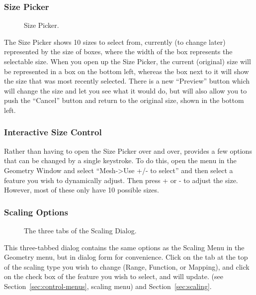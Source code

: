 \subsubsection{Size Picker}

\begin{figure}[htb]
  \begin{makeimage}
  \end{makeimage}
  \sizepicker
  \caption{\label{fig:sizepicker1} Size Picker.}
\end{figure}


The Size Picker shows 10 sizes to select from, currently (to change later)
represented by the size of boxes, where the width of the box represents the
selectable size.  When you open up the Size Picker, the current (original)
size will be represented in a box on the bottom left, whereas the box next
to it will show the size that was most recently selected.  There is a new
``Preview'' button which will change the size and let you see what it would
do, but will also allow you to push the ``Cancel'' button and return to the
original size, shown in the bottom left.

\subsubsection{Interactive Size Control}
\label{sec:interactive-size}

Rather than having to open the Size Picker over and over, \map{} provides a
few options that can be changed by a single keystroke.  To do this, open
the menu in the Geometry Window and select ``Mesh->Use +/- to select'' and
then select a feature you wish to dynamically adjust.  Then press + or - to
adjust the size.  However, most of these only have 10 possible sizes.



\subsubsection{Scaling Options}
\label{sec:scalinggui}

\begin{figure}[htb]
  \begin{makeimage}
  \end{makeimage}
  \scaledialog
  \caption{\label{fig:scale1} The three tabs of the Scaling Dialog.}
\end{figure}

This three-tabbed dialog contains the same options as the Scaling Menu in
the Geometry menu, but in dialog form for convenience.  Click on the tab at
the top of the scaling type you wish to change (Range, Function, or
Mapping), and click on the check box of the feature you wish to select, and
\map{} will update.  (see Section~\ref{sec:control-menus}, scaling menu)
and Section~\ref{sec:scaling}.


